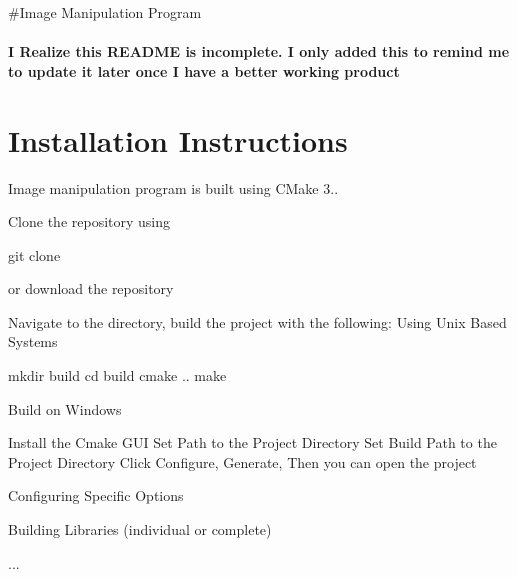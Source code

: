 \#\+Image Manipulation Program

\paragraph*{I Realize this R\+E\+A\+D\+ME is incomplete. I only added this to remind me to update it later once I have a better working product}

\section*{Installation Instructions}

Image manipulation program is built using C\+Make 3..


\begin{DoxyEnumerate}
\item Clone the repository using
\end{DoxyEnumerate}


\begin{DoxyCode}
git clone 
\end{DoxyCode}


or download the repository


\begin{DoxyEnumerate}
\item Navigate to the directory, build the project with the following\+: Using Unix Based Systems 
\begin{DoxyCode}
mkdir build
cd build
cmake ..
make
\end{DoxyCode}
 Build on Windows 
\begin{DoxyCode}
Install the Cmake GUI
Set Path to the Project Directory
Set Build Path to the Project Directory
Click Configure, Generate, Then you can open the project
\end{DoxyCode}

\item Configuring Specific Options
\item Building Libraries (individual or complete)
\item ... 
\end{DoxyEnumerate}